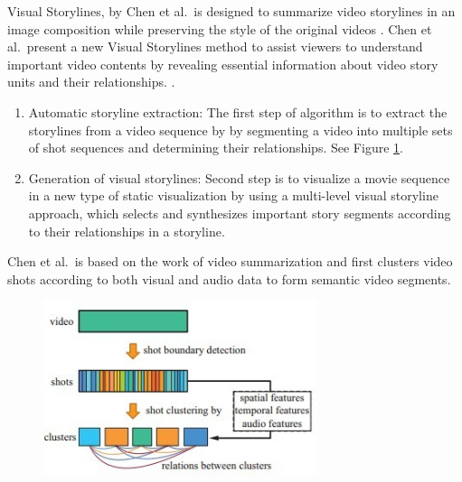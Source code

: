 \documentclass{egpubl}
\begin{document}
Visual Storylines, by Chen et al.\, is designed to summarize video storylines in an image composition while preserving the style of the original videos \cite{chen2012visual}.
Chen et al.\ present a new Visual Storylines method to assist viewers to understand important video contents by
revealing essential information about video story units and their relationships. \cite{chen2012visual}.
\begin{enumerate}
\item Automatic storyline extraction: The first step of algorithm is to extract the storylines from a video sequence by by segmenting a video
into multiple sets of shot sequences and determining their relationships. See Figure \ref{chen2012}.
\item Generation of visual storylines: Second step is to visualize a movie sequence in a new type of static visualization by using a multi-level visual storyline approach, which selects and synthesizes important story segments according to their relationships in a storyline.
\end{enumerate}
Chen et al.\ is based on the work of video summarization \cite{yahiaoui2001automatic} and first clusters video shots according
to both visual and audio data to form semantic video segments.
\begin{figure}
\begingroup
\centering
\includegraphics[width=8cm]{./images/chen2012}
\label{chen2012}
\endgroup
\end{figure}
\end{document}
